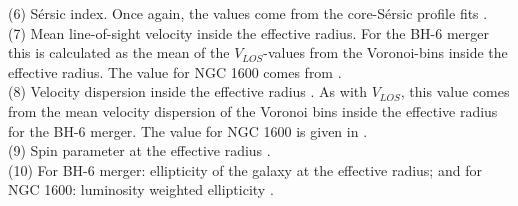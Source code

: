 \documentclass[english, oneside]{HYgradu}
\begin{document}
\begin{table}
{	(6) Sérsic index. Once again, the values come from the core-Sérsic profile fits \citep{Thomas2016}. \\
	(7) Mean line-of-sight velocity inside the effective radius. For the BH-6 merger this is calculated as the mean of the $V_{LOS}$-values from the Voronoi-bins inside the effective radius. The value for NGC 1600 comes from \cite{Bender1994}. \\
	(8) Velocity dispersion inside the effective radius \citep{Veale2017veldisp}. As with $V_{LOS}$, this value comes from the mean velocity dispersion of the Voronoi bins inside the effective radius for the BH-6 merger. The value for NGC 1600 is given in \cite{Veale2017veldisp}.\\
	(9) Spin parameter at the effective radius \citep{Veale2018lambda}. \\
	(10) For BH-6 merger: ellipticity of the galaxy at the effective radius; and for NGC 1600: luminosity weighted ellipticity \citep{Goullaud2018}.
	}
	\label{table:snap6_vs_NGC1600}
\end{table}
\end{document}
